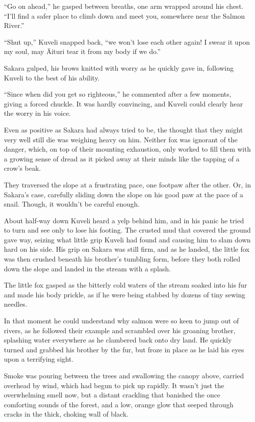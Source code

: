``Go on ahead,'' he gasped between breaths, one arm wrapped around his chest. ``I'll find a safer place to climb down and meet you, somewhere near the Salmon River.''

``Shut up,'' Kuveli snapped back, ``we won't lose each other again! I swear it upon my soul, may Äituri tear it from my body if we do.''

Sakara gulped, his brows knitted with worry as he quickly gave in, following Kuveli to the best of his ability.

``Since when did you get so righteous,'' he commented after a few moments, giving a forced chuckle. It was hardly convincing, and Kuveli could clearly hear the worry in his voice.

Even as positive as Sakara had always tried to be, the thought that they might very well still die was weighing heavy on him. Neither fox was ignorant of the danger, which, on top of their mounting exhaustion, only worked to fill them with a growing sense of dread as it picked away at their minds like the tapping of a crow's beak.

They traversed the slope at a frustrating pace, one footpaw after the other. Or, in Sakara's case, carefully sliding down the slope on his good paw at the pace of a snail. Though, it wouldn't be careful enough.

About half-way down Kuveli heard a yelp behind him, and in his panic he tried to turn and see only to lose his footing. The crusted mud that covered the ground gave way, seizing what little grip Kuveli had found and causing him to slam down hard on his side. His grip on Sakara was still firm, and as he landed, the little fox was then crushed beneath his brother's tumbling form, before they both rolled down the slope and landed in the stream with a splash.

The little fox gasped as the bitterly cold waters of the stream soaked into his fur and made his body prickle, as if he were being stabbed by dozens of tiny sewing needles.

In that moment he could understand why salmon were so keen to jump out of rivers, as he followed their example and scrambled over his groaning brother, splashing water everywhere as he clambered back onto dry land. He quickly turned and grabbed his brother by the fur, but froze in place as he laid his eyes upon a terrifying sight.

Smoke was pouring between the trees and swallowing the canopy above, carried overhead by wind, which had begun to pick up rapidly. It wasn't just the overwhelming smell now, but a distant crackling that banished the once comforting sounds of the forest, and a low, orange glow that seeped through cracks in the thick, choking wall of black.

